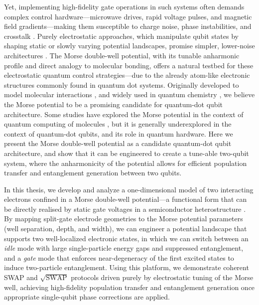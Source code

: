 \documentclass{subfiles}
\begin{document}
Yet, implementing high-fidelity gate operations in such systems often demands complex control hardware—microwave drives, rapid voltage pulses, and magnetic field gradients—making them susceptible to charge noise, phase instabilities, and crosstalk \cite{xue2022quantum, kuhlmann2013charge, heinz2021crosstalk}. Purely electrostatic approaches, which manipulate qubit states by shaping static or slowly varying potential landscapes, promise simpler, lower-noise architectures \cite{veldhorst2014addressable, leinonen2024coulomb}. The Morse double-well potential, with its tunable anharmonic profile and direct analogy to molecular bonding, offers a natural testbed for these electrostatic quantum control strategies—due to the already atom-like electronic structures commonly found in quantum dot systems. Originally developed to model molecular interactions \cite{morse1929diatomic}, and widely used in quantum chemistry \cite{}, we believe the Morse potential to be a promising candidate for quantum-dot qubit architecture. Some studies have explored the Morse potential in the context of quantum computing of molecules \cite{apanavicius2021morse}, but it is generally underexplored in the context of quantum-dot qubits, and its role in quantum hardware. Here we present the Morse double-well potential as a candidate quantum-dot qubit architecture, and show that it can be engineered to create a tune-able two-qubit system, where the anharmonicity of the potential allows for efficient population transfer and entanglement generation between two qubits. 

In this thesis, we develop and analyze a one-dimensional model of two interacting electrons confined in a Morse double-well potential—a functional form that can be directly realised by static gate voltages in a semiconductor heterostructure \cite{?}. By mapping split-gate electrode geometries to the Morse potential parameters (well separation, depth, and width), we can engineer a potential landscape that supports two well-localized electronic states, in which we can switch between an \textit{idle} mode with large single-particle energy gaps and suppressed entanglement, and a \textit{gate} mode that enforces near-degeneracy of the first excited states to induce two-particle entanglement. Using this platform, we demonstrate coherent SWAP and $\sqrt{\text{SWAP}}$ protocols driven purely by electrostatic tuning of the Morse well, achieving high-fidelity population transfer and entanglement generation once appropriate single-qubit phase corrections are applied.
\end{document}
